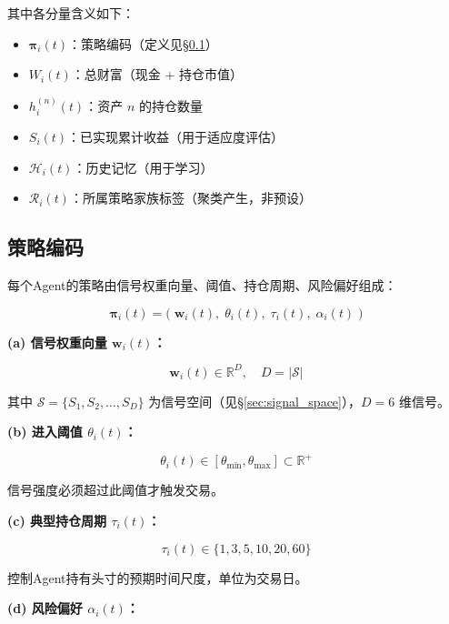 其中各分量含义如下：
\begin{itemize}
    \item $\boldsymbol{\pi}_i(t)$：策略编码（定义见\S\ref{sec:strategy_encoding}）
    \item $W_i(t)$：总财富（现金 + 持仓市值）
    \item $h_i^{(n)}(t)$：资产 $n$ 的持仓数量
    \item $S_i(t)$：已实现累计收益（用于适应度评估）
    \item $\mathcal{H}_i(t)$：历史记忆（用于学习）
    \item $\mathcal{R}_i(t)$：所属策略家族标签（聚类产生，非预设）
\end{itemize}

\subsection{策略编码}
\label{sec:strategy_encoding}

每个Agent的策略由信号权重向量、阈值、持仓周期、风险偏好组成：

\begin{equation}
\boxed{\boldsymbol{\pi}_i(t) = \bigl(\; \mathbf{w}_i(t),\; \theta_i(t),\; \tau_i(t),\; \alpha_i(t) \;\bigr)}
\label{eq:strategy}
\end{equation}

\textbf{(a) 信号权重向量 $\mathbf{w}_i(t)$：}

\begin{equation}
\mathbf{w}_i(t) \in \mathbb{R}^D, \quad D = |\mathcal{S}|
\end{equation}

其中 $\mathcal{S} = \{S_1, S_2, \ldots, S_D\}$ 为信号空间（见\S\ref{sec:signal_space}），$D = 6$ 维信号。

\textbf{(b) 进入阈值 $\theta_i(t)$：}

\begin{equation}
\theta_i(t) \in [\theta_{\min}, \theta_{\max}] \subset \mathbb{R}^+
\end{equation}

信号强度必须超过此阈值才触发交易。

\textbf{(c) 典型持仓周期 $\tau_i(t)$：}

\begin{equation}
\tau_i(t) \in \{1, 3, 5, 10, 20, 60\}
\end{equation}

控制Agent持有头寸的预期时间尺度，单位为交易日。

\textbf{(d) 风险偏好 $\alpha_i(t)$：}

